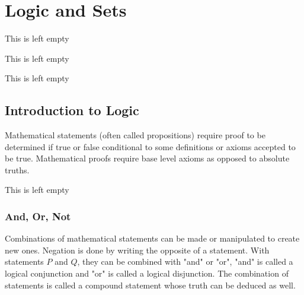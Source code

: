 \chapter{Logic and Sets}

\begin{example}
    This is left empty
\end{example}

\begin{definition}
    This is left empty
\end{definition}

\begin{remark}
    This is left empty
\end{remark}

\section{Introduction to Logic}

Mathematical statements (often called propositions) require proof to be determined if true or false conditional to some definitions or axioms accepted to be true.
Mathematical proofs require base level axioms as opposed to absolute truths.

\begin{remark}
    This is left empty
\end{remark}

\subsection{And, Or, Not}

Combinations of mathematical statements can be made or manipulated to create new ones.
Negation is done by writing the opposite of a statement.
With statements $P$ and $Q$, they can be combined with "and" or "or", "and" is called a logical conjunction and "or" is called a logical disjunction.
The combination of statements is called a compound statement whose truth can be deduced as well.


